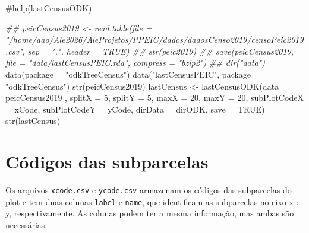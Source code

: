 \documentclass[
  letterpaper,
]{report}
\newenvironment{Shaded}{\begin{snugshade}}{\end{snugshade}}
\newcommand{\AttributeTok}[1]{\textcolor[rgb]{0.40,0.45,0.13}{#1}}
\newcommand{\CommentTok}[1]{\textcolor[rgb]{0.37,0.37,0.37}{#1}}
\newcommand{\ConstantTok}[1]{\textcolor[rgb]{0.56,0.35,0.01}{#1}}
\newcommand{\DecValTok}[1]{\textcolor[rgb]{0.68,0.00,0.00}{#1}}
\newcommand{\DocumentationTok}[1]{\textcolor[rgb]{0.37,0.37,0.37}{\textit{#1}}}
\newcommand{\FunctionTok}[1]{\textcolor[rgb]{0.28,0.35,0.67}{#1}}
\newcommand{\NormalTok}[1]{\textcolor[rgb]{0.00,0.23,0.31}{#1}}
\newcommand{\OtherTok}[1]{\textcolor[rgb]{0.00,0.23,0.31}{#1}}
\newcommand{\StringTok}[1]{\textcolor[rgb]{0.13,0.47,0.30}{#1}}
\begin{document}
\begin{Shaded}
\begin{Highlighting}[]
\CommentTok{\#help(lastCensusODK)}

\DocumentationTok{\#\# peicCensus2019 \textless{}{-} read.table(file = "/home/aao/Ale2026/AleProjetos/PPEIC/dados/dadosCenso2019/censoPeic2019.csv", sep = ",", header = TRUE)}
\DocumentationTok{\#\# str(peic2019)}
\DocumentationTok{\#\# save(peicCensus2019, file = "data/lastCensusPEIC.rda", compress = "bzip2")}
\DocumentationTok{\#\# dir("data")}
\FunctionTok{data}\NormalTok{(}\AttributeTok{package =} \StringTok{"odkTreeCensus"}\NormalTok{)}
\FunctionTok{data}\NormalTok{(}\StringTok{"lastCensusPEIC"}\NormalTok{, }\AttributeTok{package =} \StringTok{"odkTreeCensus"}\NormalTok{)}
\FunctionTok{str}\NormalTok{(peicCensus2019)}
\NormalTok{lastCensus }\OtherTok{\textless{}{-}} \FunctionTok{lastCensusODK}\NormalTok{(}\AttributeTok{data =}\NormalTok{ peicCensus2019 , }\AttributeTok{splitX =} \DecValTok{5}\NormalTok{, }\AttributeTok{splitY =} \DecValTok{5}\NormalTok{, }\AttributeTok{maxX =} \DecValTok{20}\NormalTok{, }\AttributeTok{maxY =} \DecValTok{20}\NormalTok{, }\AttributeTok{subPlotCodeX =}\NormalTok{ xCode, }\AttributeTok{subPlotCodeY =}\NormalTok{ yCode, }\AttributeTok{dirData =}\NormalTok{ dirODK, }\AttributeTok{save =} \ConstantTok{TRUE}\NormalTok{)}
\FunctionTok{str}\NormalTok{(lastCensus)}
\end{Highlighting}
\end{Shaded}

\section{Códigos das subparcelas}\label{cuxf3digos-das-subparcelas}

Os arquivos \texttt{xcode.csv} e \texttt{ycode.csv} armazenam os códigos
das subparcelas do plot e tem duas colunas \texttt{label} e
\texttt{name}, que identificam as subparcelas no eixo x e y,
respectivamente. As colunas podem ter a mesma informação, mas ambas são
necessárias.
\end{document}
